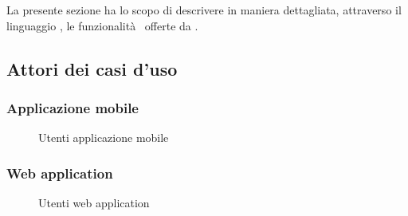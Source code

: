 \documentclass[../analisi-dei-requisiti.tex]{subfiles}
\begin{document}
La presente sezione ha lo scopo di descrivere in maniera dettagliata, attraverso il linguaggio , le funzionalità  offerte da .

\subsection{Attori dei casi d'uso}%
\label{sub:attori_casi_duso}

\subsubsection{Applicazione mobile}%
\label{subs:mobile_app}

\begin{figure}[H]
  \centering
  \caption{Utenti applicazione mobile}%
  \label{fig:usersapp}
\end{figure}

\subsubsection{Web application}%
\label{subs:web_application}

\begin{figure}[H]
  \centering
  \caption{Utenti web application}%
  \label{fig:usersweb}
\end{figure}
\end{document}
